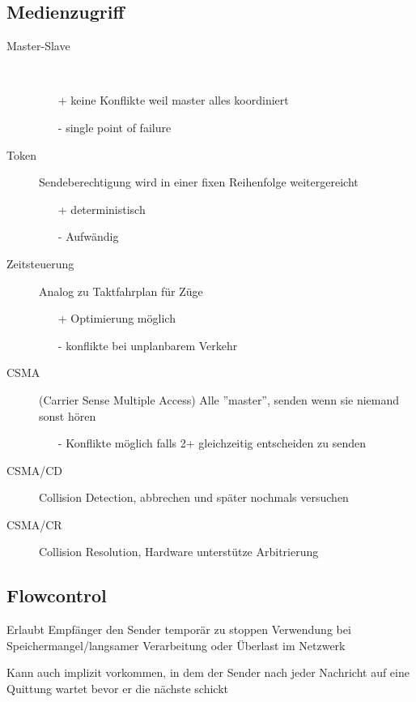 \subsection{Medienzugriff}
\begin{description}
	\item[Master-Slave] \,
		\begin{itemize}
			\item[+] keine Konflikte weil master alles koordiniert
			\item[-] single point of failure
		\end{itemize}
	\item[Token] Sendeberechtigung wird in einer fixen Reihenfolge weitergereicht
		\begin{itemize}
			\item[+] deterministisch
			\item[-] Aufwändig
		\end{itemize}
	\item[Zeitsteuerung] Analog zu Taktfahrplan für Züge
		\begin{itemize}
			\item[+] Optimierung möglich
			\item[-] konflikte bei unplanbarem Verkehr
		\end{itemize}
	\item[CSMA] (Carrier Sense Multiple Access) Alle ''master'', senden wenn sie niemand
		sonst hören
		\begin{itemize}
			\item[-] Konflikte möglich falls 2+ gleichzeitig entscheiden zu senden
		\end{itemize}
	\item[CSMA/CD] Collision Detection, abbrechen und später nochmals versuchen
	\item[CSMA/CR] Collision Resolution, Hardware unterstütze Arbitrierung
\end{description}

\subsection{Flowcontrol}

Erlaubt Empfänger den Sender temporär zu stoppen
Verwendung bei Speichermangel/langsamer Verarbeitung oder Überlast im Netzwerk

Kann auch implizit vorkommen, in dem der Sender nach jeder Nachricht auf eine
Quittung wartet bevor er die nächste schickt








